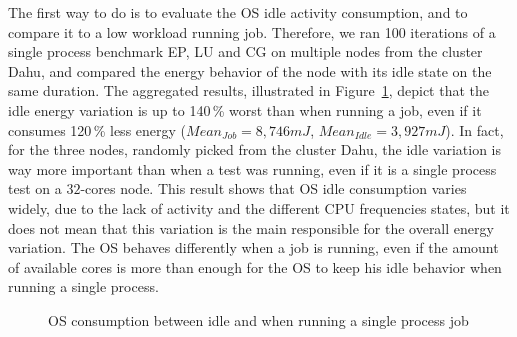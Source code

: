 The first way to do is to evaluate the OS idle activity consumption, and to compare it to a low workload running job.
Therefore, we ran 100 iterations of a single process benchmark \textsf{EP}, \textsf{LU} and \textsf{CG} on multiple nodes from the cluster \textsf{Dahu}, and compared the energy behavior of the node with its idle state on the same duration.
The aggregated results, illustrated in Figure~\ref{fig:os-idle}, depict that the idle energy variation is up to 140\,\% worst than when running a job, even if it consumes 120\,\% less energy ($Mean_{Job}=8,746 mJ$, $Mean_{Idle}=3,927 mJ$).
In fact, for the three nodes, randomly picked from the cluster \textsf{Dahu}, the idle variation is way more important than when a test was running, even if it is a single process test on a $32$-cores node.
This result shows that OS idle consumption varies widely, due to the lack of activity and the different CPU frequencies states, but it does not mean that this variation is the main responsible for the overall energy variation.
The OS behaves differently when a job is running, even if the amount of available cores is more than enough for the OS to keep his idle behavior when running a single process.

\begin{figure}
    \caption{OS consumption between idle and when running a single process job}\label{fig:os-idle}
\end{figure}

